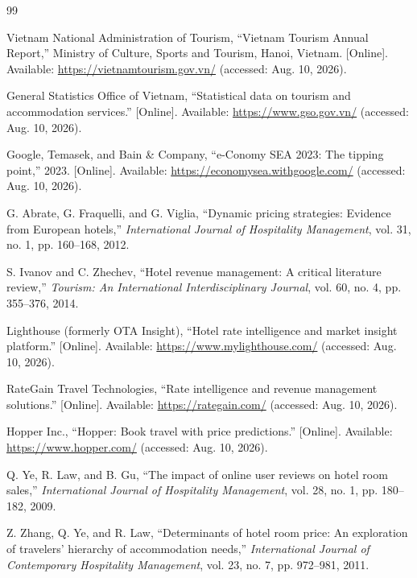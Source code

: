 \begin{thebibliography}{99}

Vietnam National Administration of Tourism, ``Vietnam Tourism Annual Report,'' Ministry of Culture, Sports and Tourism, Hanoi, Vietnam. [Online]. Available: \url{https://vietnamtourism.gov.vn/} (accessed: Aug. 10, 2026).

General Statistics Office of Vietnam, ``Statistical data on tourism and accommodation services.'' [Online]. Available: \url{https://www.gso.gov.vn/} (accessed: Aug. 10, 2026).

Google, Temasek, and Bain \& Company, ``e-Conomy SEA 2023: The tipping point,'' 2023. [Online]. Available: \url{https://economysea.withgoogle.com/} (accessed: Aug. 10, 2026).

G. Abrate, G. Fraquelli, and G. Viglia, ``Dynamic pricing strategies: Evidence from European hotels,'' \textit{International Journal of Hospitality Management}, vol. 31, no. 1, pp. 160--168, 2012.

S. Ivanov and C. Zhechev, ``Hotel revenue management: A critical literature review,'' \textit{Tourism: An International Interdisciplinary Journal}, vol. 60, no. 4, pp. 355--376, 2014.

Lighthouse (formerly OTA Insight), ``Hotel rate intelligence and market insight platform.'' [Online]. Available: \url{https://www.mylighthouse.com/} (accessed: Aug. 10, 2026).

RateGain Travel Technologies, ``Rate intelligence and revenue management solutions.'' [Online]. Available: \url{https://rategain.com/} (accessed: Aug. 10, 2026).

Hopper Inc., ``Hopper: Book travel with price predictions.'' [Online]. Available: \url{https://www.hopper.com/} (accessed: Aug. 10, 2026).

Q. Ye, R. Law, and B. Gu, ``The impact of online user reviews on hotel room sales,'' \textit{International Journal of Hospitality Management}, vol. 28, no. 1, pp. 180--182, 2009.

Z. Zhang, Q. Ye, and R. Law, ``Determinants of hotel room price: An exploration of travelers' hierarchy of accommodation needs,'' \textit{International Journal of Contemporary Hospitality Management}, vol. 23, no. 7, pp. 972--981, 2011.


\end{thebibliography}
